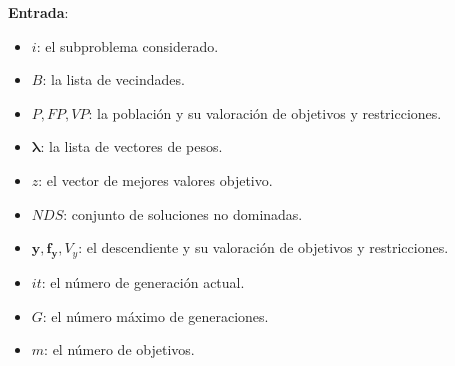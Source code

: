 \begin{center}
\begin{minipage}[H]{0.8\linewidth}
    \begin{algorithm}[H]
\SetAlgoLined
 \textbf{Entrada}:
 \begin{itemize}
 
     \vspace{0.15cm} \item $i$: el subproblema considerado.
     \vspace{0.15cm} \item $B$: la lista de vecindades. 
     \vspace{0.15cm} \item $P, FP, VP$: la población y su valoración de objetivos y restricciones.
     \vspace{0.15cm} \item $\boldsymbol{\lambda}$: la lista de vectores de pesos.
     \vspace{0.15cm} \item $z$: el vector de mejores valores objetivo.
     \vspace{0.15cm} \item $NDS$: conjunto de soluciones no dominadas.
     \vspace{0.15cm} \item $\boldsymbol{y},\boldsymbol{f_y}, V_y$: el descendiente y su valoración de objetivos y restricciones.
     \vspace{0.15cm} \item $it$: el número de generación actual.
     \vspace{0.15cm} \item $G$: el número máximo de generaciones.
     \vspace{0.15cm} \item $m$: el número de objetivos.
 \end{itemize}
 
 \vspace{0.3cm}
  

\end{algorithm}
\end{minipage}
\end{center}
